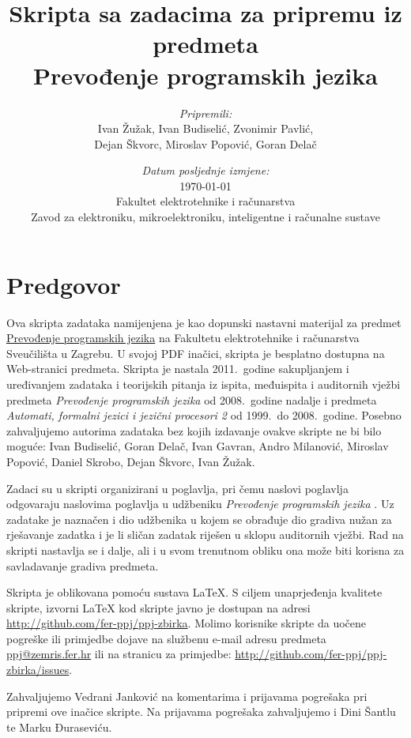 \documentclass[times, 12pt, utf8]{book}
\title{
\vfill
Skripta sa zadacima za pripremu iz predmeta \\
Prevođenje programskih jezika \\
\vspace{70pt}
}
\author{
\emph{Pripremili:} \\
Ivan Žužak, Ivan Budiselić, Zvonimir Pavlić, \\
Dejan Škvorc, Miroslav Popović, Goran Delač \\}
\date{
\vspace{30pt} 
\emph{Datum posljednje izmjene:} \\
\today \\
\vfill
Fakultet elektrotehnike i računarstva \\
Zavod za elektroniku, mikroelektroniku, inteligentne i računalne sustave
}
\begin{document}
\maketitle

\let\cleardoublepage\clearpage

\tableofcontents


\chapter*{Predgovor}

\begin{spacing}{1.5}
Ova skripta zadataka namijenjena je kao dopunski nastavni materijal za predmet \href{http://www.fer.unizg.hr/predmet/ppj_a}{Prevođenje programskih jezika} na Fakultetu elektrotehnike i računarstva Sveučilišta u Zagrebu. 
U svojoj PDF inačici, skripta je besplatno dostupna na Web-stranici predmeta.
Skripta je nastala 2011.~godine sakupljanjem i uređivanjem zadataka i teorijskih pitanja iz ispita, međuispita i auditornih vježbi predmeta \emph{Prevođenje programskih jezika} od 2008.~godine nadalje i predmeta \emph{Automati, formalni jezici i jezični procesori 2} od 1999.~do 2008.~godine.
Posebno zahvaljujemo autorima zadataka bez kojih izdavanje ovakve skripte ne bi bilo moguće:
Ivan Budiselić,
Goran Delač,
Ivan Gavran,
Andro Milanović,
Miroslav Popović,
Daniel Skrobo,
Dejan Škvorc,
Ivan Žužak.

Zadaci su u skripti organizirani u poglavlja, pri čemu naslovi poglavlja odgovaraju naslovima poglavlja u udžbeniku \emph{Prevođenje programskih jezika} \cite{udzbenik}.
Uz zadatake je naznačen i dio udžbenika u kojem se obrađuje dio gradiva nužan za rješavanje zadatka i je li sličan zadatak riješen u sklopu auditornih vježbi.
Rad na skripti nastavlja se i dalje, ali i u svom trenutnom obliku ona može biti korisna za savladavanje gradiva predmeta.

Skripta je oblikovana pomoću sustava \LaTeX{}.
S ciljem unaprjeđenja kvalitete skripte, izvorni \LaTeX{} kod skripte javno je dostupan na adresi \url{http://github.com/fer-ppj/ppj-zbirka}.
Molimo korisnike skripte da uočene pogreške ili primjedbe dojave na službenu e-mail adresu predmeta \href{mailto:ppj@zemris.fer.hr}{ppj@zemris.fer.hr} ili na stranicu za primjedbe: \url{http://github.com/fer-ppj/ppj-zbirka/issues}. 

Zahvaljujemo Vedrani Janković na komentarima i prijavama pogrešaka pri pripremi ove inačice skripte.
Na prijavama pogrešaka zahvaljujemo i Dini Šantlu te Marku Đuraseviću.
\end{spacing}
\end{document}
